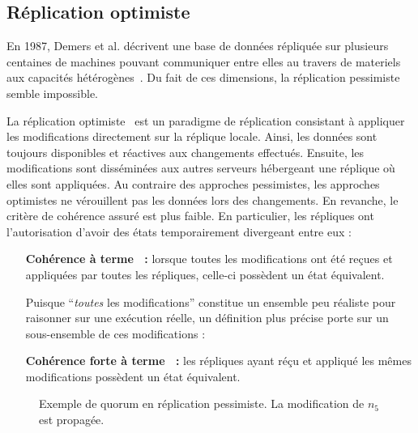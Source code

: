 \subsection{Réplication optimiste}

En 1987, Demers et al. décrivent une base de données répliquée sur plusieurs
centaines de machines pouvant communiquer entre elles au travers de materiels
aux capacités hétérogènes~\cite{demers1987epidemic}. Du fait de ces dimensions,
la réplication pessimiste semble impossible.

La réplication optimiste~\cite{johnson1975maintenance, saito2005optimistic} est
un paradigme de réplication consistant à appliquer les modifications directement
sur la réplique locale.  Ainsi, les données sont toujours disponibles et
réactives aux changements effectués. Ensuite, les modifications sont disséminées
aux autres serveurs hébergeant une réplique où elles sont appliquées. Au
contraire des approches pessimistes, les approches optimistes ne vérouillent pas
les données lors des changements. En revanche, le critère de cohérence assuré
est plus faible. En particulier, les répliques ont l'autorisation d'avoir des
états temporairement divergeant entre eux :

\begin{itemize}
\item [\textbf{Cohérence à terme~\cite{bailis2013eventual} :}] lorsque toutes
  les modifications ont été reçues et appliquées par toutes les répliques,
  celle-ci possèdent un état équivalent.

  Puisque ``\emph{toutes} les modifications'' constitue un ensemble peu réaliste
  pour raisonner sur une exécution réelle, un définition plus précise porte sur
  un sous-ensemble de ces modifications :
\item [\textbf{Cohérence forte à terme~\cite{shapiro2011conflict} :}] les
  répliques ayant réçu et appliqué les mêmes modifications possèdent un état
  équivalent.
\end{itemize}

\begin{figure*}
  \centering
  \hspace{40pt}
  \hspace{10pt}
  \caption{\label{repl:fig:pessimisticexample} Exemple de quorum en réplication
    pessimiste. La modification de $n_5$ est propagée.}
\end{figure*}


